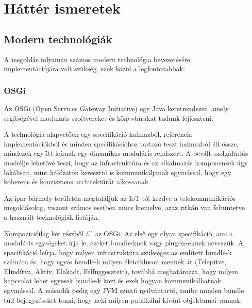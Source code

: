 
\chapter{Háttér ismeretek}
\section{Modern technológiák}

A megoldás folyamán számos modern technológia bevezetésére, implementációjára volt szükség,  ezek közül a legfontosabbak:

\subsection{OSGi}

Az OSGi (Open Services Gateway Initiative) \cite{alliance} egy Java keretrendszer, amely segítségével moduláris szoftvereket és könyvtárakat tudunk fejleszteni.

A technológia alapvetően egy specifikáció halmazból, referencia implementációkból és minden specifikációhoz tartozó teszt halmazból áll össze, mindezek együtt leírnak egy dinamikus moduláris rendszert. A bevált szolgáltatás modellje lehetővé teszi, hogy az infrastruktúra és az alkalmazás komponensek úgy lokálisan, mint hálózaton keresztül is kommunikáljanak egymással, hogy egy koherens és konzisztens architektúrát alkossanak.

Az ipar bármely területén megtaláljuk az IoT-tól kezdve a telekommunikációs megoldásokig, viszont számos esetben nincs kiemelve, azaz ritkán van feltüntetve a használt technológiák listáján. 

Kompozícióilag két részből áll az OSGi. Az első egy olyan specifikáció, ami a moduláris egységeket írja le, ezeket bundle-knek vagy plug-in-eknek nevezzük. A specifikáció leírja, hogy milyen infrastruktúra szükséges az említett bundle-k számára és, hogy egyes bundle-k milyen életcikluson mennek át (Telepítve, Elindítva, Aktív, Elakadt, Felfüggesztett), továbbá meghatározza, hogy milyen kapcsolat lehet egyesek bundle-k közt és ezek hogyan kommunikálhatnak egymással. A második pedig egy JVM szintű nyilvántartó, amibe minden bundle tud bejegyzéseket tenni, hogy neki milyen publikálni kívánt objektumai vannak.


